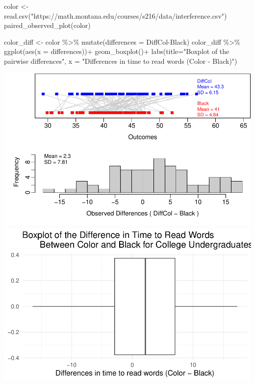\documentclass[
]{report}
\newenvironment{Shaded}{\begin{snugshade}}{\end{snugshade}}
\newcommand{\AttributeTok}[1]{\textcolor[rgb]{0.77,0.63,0.00}{#1}}
\newcommand{\FunctionTok}[1]{\textcolor[rgb]{0.00,0.00,0.00}{#1}}
\newcommand{\NormalTok}[1]{#1}
\newcommand{\OtherTok}[1]{\textcolor[rgb]{0.56,0.35,0.01}{#1}}
\newcommand{\SpecialCharTok}[1]{\textcolor[rgb]{0.00,0.00,0.00}{#1}}
\newcommand{\StringTok}[1]{\textcolor[rgb]{0.31,0.60,0.02}{#1}}
\begin{document}
\begin{Shaded}
\begin{Highlighting}[]
\NormalTok{color }\OtherTok{\textless{}{-}} \FunctionTok{read.csv}\NormalTok{(}\StringTok{"https://math.montana.edu/courses/s216/data/interference.csv"}\NormalTok{)}
\FunctionTok{paired\_observed\_plot}\NormalTok{(color)}

\NormalTok{color\_diff }\OtherTok{\textless{}{-}}\NormalTok{ color }\SpecialCharTok{\%\textgreater{}\%} 
  \FunctionTok{mutate}\NormalTok{(}\AttributeTok{differences =}\NormalTok{ DiffCol}\SpecialCharTok{{-}}\NormalTok{Black)}
\NormalTok{color\_diff }\SpecialCharTok{\%\textgreater{}\%}
  \FunctionTok{ggplot}\NormalTok{(}\FunctionTok{aes}\NormalTok{(}\AttributeTok{x =}\NormalTok{ differences))}\SpecialCharTok{+}
  \FunctionTok{geom\_boxplot}\NormalTok{()}\SpecialCharTok{+}
  \FunctionTok{labs}\NormalTok{(}\AttributeTok{title=}\StringTok{"Boxplot of the pairwise differences"}\NormalTok{,}
       \AttributeTok{x =} \StringTok{"Differences in time to read words (Color {-} Black)"}\NormalTok{)}
\end{Highlighting}
\end{Shaded}

\begin{center}\includegraphics[width=0.7\linewidth]{11-OCA08-paired-theory_files/figure-latex/unnamed-chunk-1-1} \includegraphics[width=0.7\linewidth]{11-OCA08-paired-theory_files/figure-latex/unnamed-chunk-1-2} \end{center}
\end{document}
